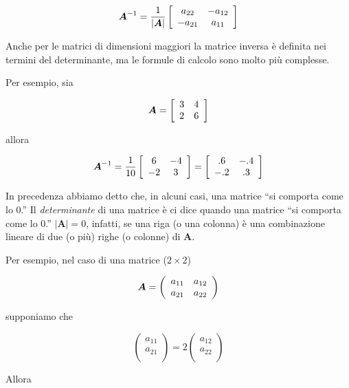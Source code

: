 \documentclass[
  11pt,
]{krantz}
\theoremstyle{definition}
\theoremstyle{definition}
\theoremstyle{definition}
\theoremstyle{definition}
\theoremstyle{remark}
\begin{document}
\[\boldsymbol{A}^{-1} = \frac{1}{|\boldsymbol{A}|} \left[
\begin{array}{c c}
a_{22} & -a_{12} \\
-a_{21} & a_{11}
\end{array}
 \right]\]

Anche per le matrici di dimensioni maggiori la matrice inversa è definita nei termini del determinante, ma le formule di calcolo sono molto più complesse.

Per esempio, sia

\[\boldsymbol{A} = \left[ \begin{array}{c c}
3 & 4 \\
2 & 6
\end{array}
\right]\]

allora

\[\boldsymbol{A}^{-1} = \frac{1}{10} \left[
\begin{array}{c c}
6 & -4 \\
-2 & 3
\end{array}
\right]= \left[ \begin{array}{c c}
.6 & -.4 \\
-.2 & .3
\end{array}
 \right]\]

In precedenza abbiamo detto che, in alcuni casi, una matrice ``si comporta come lo 0.'' Il \emph{determinante} di una matrice è ci dice quando una matrice ``si comporta come lo 0.'' \(|\boldsymbol{A}| = 0\), infatti, se una riga (o una colonna) è una combinazione lineare di due (o più) righe (o colonne) di \(\boldsymbol{A}\).

Per esempio, nel caso di una matrice (\(2 \times 2\))

\[\boldsymbol{A} =  \left( \begin{array}{c c}
a_{11}& a_{12} \\
a_{21} & a_{22} \end{array} \right)\]

supponiamo che

\[\left(%
\begin{array}{c}
  a_{11} \\
  a_{21} \\
\end{array}%
\right)=2
\left(%
\begin{array}{c}
  a_{12} \\
  a_{22} \\
\end{array}%
\right)\]

Allora
\end{document}
